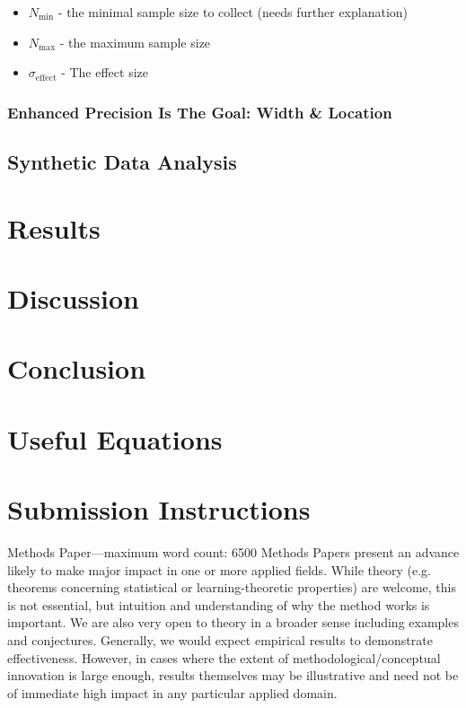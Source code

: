 \documentclass{article}
\begin{document}
  \begin{itemize}
        \item $N_\mathrm{min}$ - the minimal sample size to collect (needs further explanation)
        \item $N_\mathrm{max}$ - the maximum sample size
        \item $\sigma_\mathrm{effect}$ - The effect size
         
  \end{itemize}



\subsubsection{Enhanced Precision Is The Goal: Width \& Location}

\subsection{Synthetic Data Analysis}


\section{Results}

\section{Discussion}

\section{Conclusion}

\section{Useful Equations}


\section{Submission Instructions}

Methods Paper—maximum word count: 6500
Methods Papers present an advance likely to make major impact in one or more applied
fields. While theory (e.g. theorems concerning statistical or
learning-theoretic properties) are welcome, this is not essential, but intuition and
understanding of why the method works is important.
We are also very open to theory in a broader sense including examples and conjectures.
Generally, we would expect empirical results to demonstrate effectiveness.
However, in cases where the extent of methodological/conceptual innovation is large
enough, results themselves may be illustrative and need not be of immediate high impact
in any particular applied domain.
\end{document}
